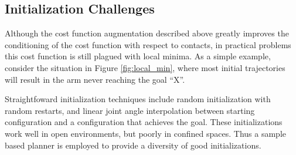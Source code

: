 \documentclass[../thesis.tex]{subfiles}
\begin{document}
\subsection{Initialization Challenges}
Although the cost function augmentation described above greatly improves the conditioning of the cost function with respect to contacts, in practical problems this cost function is still plagued with local minima.
As a simple example, consider the situation in Figure \ref{fig:local_min}, where most initial trajectories will result in the arm never reaching the goal ``X''.

Straightfoward initialization techniques include random initialization with random restarts, and linear joint angle interpolation between starting configuration and a configuration that achieves the goal.
These initializations work well in open environments, but poorly in confined spaces.
Thus a sample based planner is employed to provide a diversity of good initializations.
\end{document}
